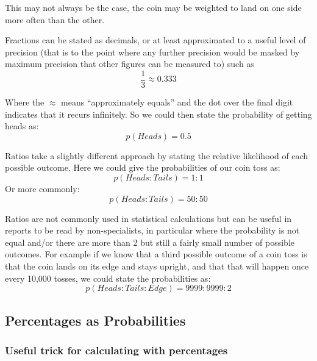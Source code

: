 This may not always be the case, the coin may be weighted to land on one side more often than the other.

Fractions can be stated as decimals, or at least approximated to a useful level of precision (that is to the point where any further precision would be masked by maximum precision that other figures can be measured to) such as
\begin{equation}
    \frac{1}{3} \approx 0.33\dot3
\end{equation}

Where the $\approx$ means ``approximately equals'' and the dot over the final digit indicates that it recurs infinitely.  So we could then state the probability of getting heads as:
\begin{equation}
p(Heads) = 0.5
\end{equation}

Ratios take a slightly different approach by stating the relative likelihood of each possible outcome.  Here we could give the probabilities of our coin toss as:
\begin{equation}
p(Heads:Tails) = 1:1
\end{equation}
Or more commonly:
\begin{equation}
p(Heads:Tails) = 50:50
\end{equation}

Ratios are not commonly used in statistical calculations but can be useful in reports to be read by non-specialists, in particular where the probability is not equal and/or there are more than 2 but still a fairly small number of possible outcomes.  For example if we know that a third possible outcome of a coin toss is that the coin lands on its edge and stays upright, and that that will happen once every 10,000 tosses, we could state the probabilities as:
\begin{equation}
p(Heads:Tails:Edge) = 9999:9999:2
\end{equation}

\subsection{Percentages as Probabilities}


\subsubsection{Useful trick for calculating with percentages}

